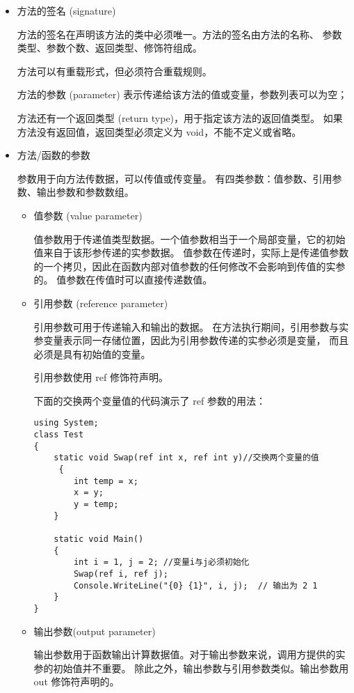 \begin{itemize}
\item 方法的签名 (signature)

方法的签名在声明该方法的类中必须唯一。方法的签名由方法的名称、
参数类型、参数个数、返回类型、修饰符组成。

方法可以有重载形式，但必须符合重载规则。

方法的参数 (parameter) 表示传递给该方法的值或变量，参数列表可以为空；

方法还有一个返回类型 (return type)，用于指定该方法的返回值类型。
如果方法没有返回值，返回类型必须定义为 void，不能不定义或省略。

\item 方法/函数的参数

参数用于向方法传数据，可以传值或传变量。
有四类参数：值参数、引用参数、输出参数和参数数组。

    \begin{itemize}
	\item 值参数 (value parameter)

    值参数用于传递值类型数据。一个值参数相当于一个局部变量，它的初始值来自于该形参传递的实参数据。
    值参数在传递时，实际上是传递值参数的一个拷贝，因此在函数内部对值参数的任何修改不会影响到传值的实参的。
    值参数在传值时可以直接传递数值。

	\item 引用参数 (reference parameter)

    引用参数可用于传递输入和输出的数据。
    在方法执行期间，引用参数与实参变量表示同一存储位置，因此为引用参数传递的实参必须是变量，
    而且必须是具有初始值的变量。

    引用参数使用 ref 修饰符声明。

    下面的交换两个变量值的代码演示了 ref 参数的用法：

\begin{lstlisting}
using System;
class Test
{
    static void Swap(ref int x, ref int y)//交换两个变量的值
     {
        int temp = x;
        x = y;
        y = temp;
    }

    static void Main()
    {
        int i = 1, j = 2; //变量i与j必须初始化
        Swap(ref i, ref j);
        Console.WriteLine("{0} {1}", i, j);  // 输出为 2 1
    }
}
\end{lstlisting}


	\item 输出参数(output parameter)

    输出参数用于函数输出计算数据值。对于输出参数来说，调用方提供的实参的初始值并不重要。
    除此之外，输出参数与引用参数类似。输出参数用 out 修饰符声明的。


\end{itemize}
\end{itemize}
